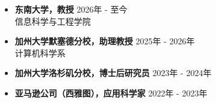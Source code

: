 \begin{itemize}
  \item \textbf{东南大学，教授} \hfill 2026年 - 至今\\
  信息科学与工程学院
  \item \textbf{加州大学默塞德分校，助理教授} \hfill 2025年 - 2026年\\
  计算机科学系
  \item \textbf{加州大学洛杉矶分校，博士后研究员} \hfill 2023年 - 2024年
  \item \textbf{亚马逊公司（西雅图），应用科学家} \hfill 2022年 - 2023年
\end{itemize}
